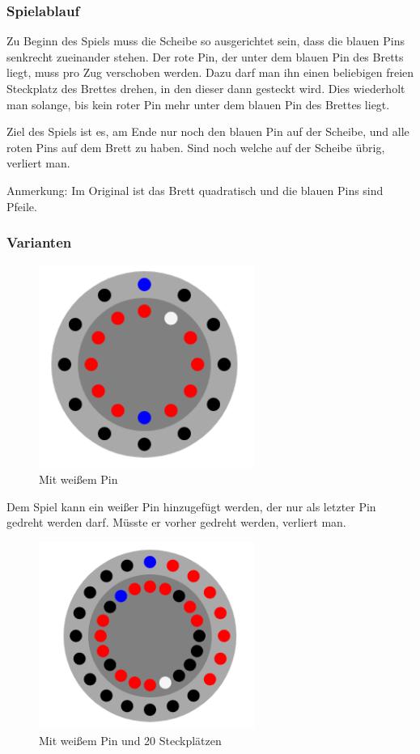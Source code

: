 \documentclass{article}
\begin{document}
\subsubsection{Spielablauf}

Zu Beginn des Spiels muss die Scheibe so ausgerichtet sein, dass die blauen Pins senkrecht zueinander stehen.
Der rote Pin, der unter dem blauen Pin des Bretts liegt, muss pro Zug verschoben werden. 
Dazu darf man ihn einen beliebigen freien Steckplatz des Brettes drehen, in den dieser dann gesteckt wird.
Dies wiederholt man solange, bis kein roter Pin mehr unter dem blauen Pin des Brettes liegt.

Ziel des Spiels ist es, am Ende nur noch den blauen Pin auf der Scheibe, und alle roten Pins auf dem Brett zu haben.
Sind noch welche auf der Scheibe übrig, verliert man.

Anmerkung: Im Original ist das Brett quadratisch und die blauen Pins sind Pfeile.

\subsubsection{Varianten}

\begin{figure}
    \centering
    \includegraphics[width=200pt]{darstellung_weiss.png}
    \caption{Mit weißem Pin}
    \label{fig:darstellung_weiss}
\end{figure}

Dem Spiel kann ein weißer Pin hinzugefügt werden, der nur als letzter Pin gedreht werden darf. Müsste er vorher gedreht werden, verliert man.

\begin{figure}
    \centering
    \includegraphics[width=200pt]{darstellung_20.png}
    \caption{Mit weißem Pin und 20 Steckplätzen}
    \label{fig:darstellung_20}
\end{figure}
\end{document}
